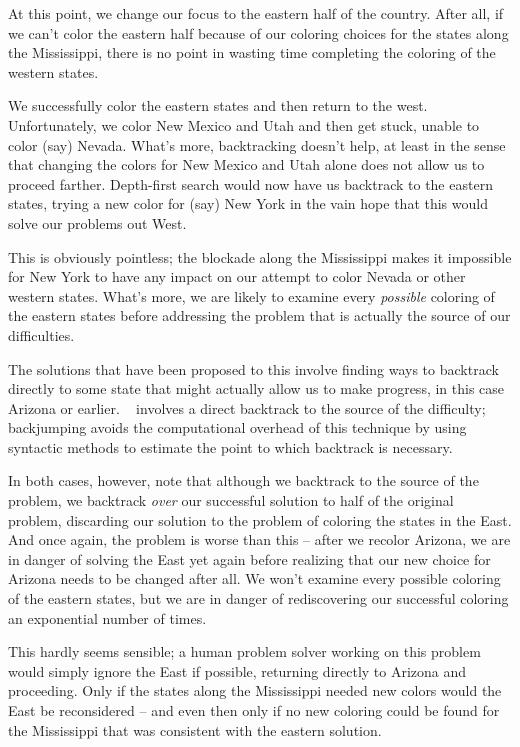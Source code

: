 At this point, we change our focus to the eastern half of the country.
After all, if we can't color the eastern half because of our coloring
choices for the states along the Mississippi, there is no point in
wasting time completing the coloring of the western states.

We successfully color the eastern states and then return to the west.
Unfortunately, we color New Mexico and Utah and then get stuck, unable
to color (say) Nevada.  What's more, backtracking doesn't help, at
least in the sense that changing the colors for New Mexico and Utah
alone does not allow us to proceed farther.  Depth-first search would
now have us backtrack to the eastern states, trying a new color for
(say) New York in the vain hope that this would solve our problems out
West.

This is obviously pointless; the blockade along the Mississippi makes
it impossible for New York to have any impact on our attempt to color
Nevada or other western states.  What's more, we are likely to examine
every {\em possible\/} coloring of the eastern states before
addressing the problem that is actually the source of our
difficulties.

The solutions that have been proposed to this involve finding ways to
backtrack directly to some state that might actually allow us to make
progress, in this case Arizona or earlier.  \Ddb\ \cite{Stallman77}
involves a direct backtrack to the source of the difficulty;
backjumping \cite{Gaschnig:bj} avoids the computational overhead of
this technique by using syntactic methods to estimate the point to
which backtrack is necessary.

In both cases, however, note that although we backtrack to the source
of the problem, we backtrack {\em over\/} our successful solution to
half of the original problem, discarding our solution to the problem
of coloring the states in the East.  And once again, the problem is
worse than this -- after we recolor Arizona, we are in danger of
solving the East yet again before realizing that our new choice for
Arizona needs to be changed after all.  We won't examine every
possible coloring of the eastern states, but we are in danger of
rediscovering our successful coloring an exponential number of times.

This hardly seems sensible; a human problem solver working on this
problem would simply ignore the East if possible, returning directly
to Arizona and proceeding.  Only if the states along the Mississippi
needed new colors would the East be reconsidered -- and even then only
if no new coloring could be found for the Mississippi that was
consistent with the eastern solution.

